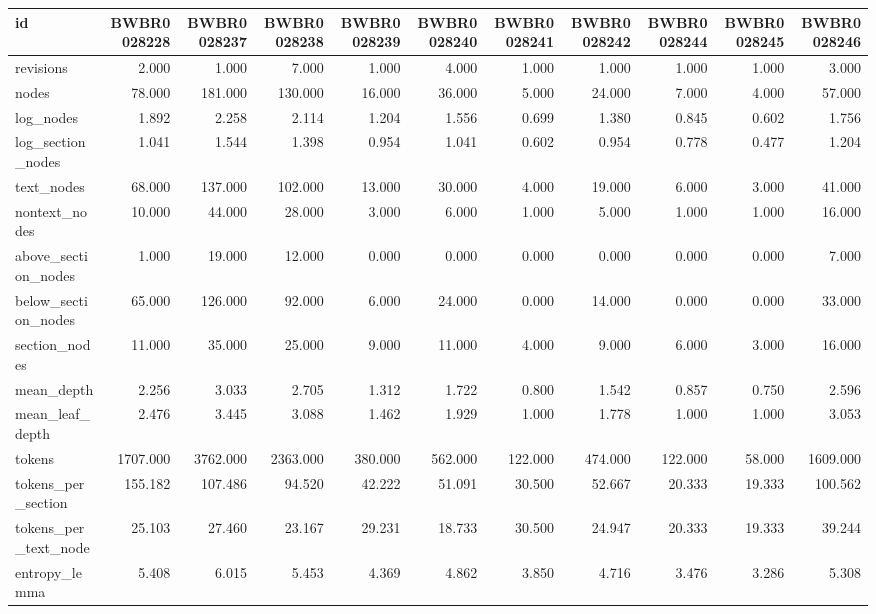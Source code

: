 \begin{tabular}{lrrrrrrrrrr}
\toprule
id & BWBR0028228 & BWBR0028237 & BWBR0028238 & BWBR0028239 & BWBR0028240 & BWBR0028241 & BWBR0028242 & BWBR0028244 & BWBR0028245 & BWBR0028246 \\
\midrule
revisions & 2.000 & 1.000 & 7.000 & 1.000 & 4.000 & 1.000 & 1.000 & 1.000 & 1.000 & 3.000 \\
\cline{1-11}
nodes & 78.000 & 181.000 & 130.000 & 16.000 & 36.000 & 5.000 & 24.000 & 7.000 & 4.000 & 57.000 \\
\cline{1-11}
log\_nodes & 1.892 & 2.258 & 2.114 & 1.204 & 1.556 & 0.699 & 1.380 & 0.845 & 0.602 & 1.756 \\
\cline{1-11}
log\_section\_nodes & 1.041 & 1.544 & 1.398 & 0.954 & 1.041 & 0.602 & 0.954 & 0.778 & 0.477 & 1.204 \\
\cline{1-11}
text\_nodes & 68.000 & 137.000 & 102.000 & 13.000 & 30.000 & 4.000 & 19.000 & 6.000 & 3.000 & 41.000 \\
\cline{1-11}
nontext\_nodes & 10.000 & 44.000 & 28.000 & 3.000 & 6.000 & 1.000 & 5.000 & 1.000 & 1.000 & 16.000 \\
\cline{1-11}
above\_section\_nodes & 1.000 & 19.000 & 12.000 & 0.000 & 0.000 & 0.000 & 0.000 & 0.000 & 0.000 & 7.000 \\
\cline{1-11}
below\_section\_nodes & 65.000 & 126.000 & 92.000 & 6.000 & 24.000 & 0.000 & 14.000 & 0.000 & 0.000 & 33.000 \\
\cline{1-11}
section\_nodes & 11.000 & 35.000 & 25.000 & 9.000 & 11.000 & 4.000 & 9.000 & 6.000 & 3.000 & 16.000 \\
\cline{1-11}
mean\_depth & 2.256 & 3.033 & 2.705 & 1.312 & 1.722 & 0.800 & 1.542 & 0.857 & 0.750 & 2.596 \\
\cline{1-11}
mean\_leaf\_depth & 2.476 & 3.445 & 3.088 & 1.462 & 1.929 & 1.000 & 1.778 & 1.000 & 1.000 & 3.053 \\
\cline{1-11}
tokens & 1707.000 & 3762.000 & 2363.000 & 380.000 & 562.000 & 122.000 & 474.000 & 122.000 & 58.000 & 1609.000 \\
\cline{1-11}
tokens\_per\_section & 155.182 & 107.486 & 94.520 & 42.222 & 51.091 & 30.500 & 52.667 & 20.333 & 19.333 & 100.562 \\
\cline{1-11}
tokens\_per\_text\_node & 25.103 & 27.460 & 23.167 & 29.231 & 18.733 & 30.500 & 24.947 & 20.333 & 19.333 & 39.244 \\
\cline{1-11}
entropy\_lemma & 5.408 & 6.015 & 5.453 & 4.369 & 4.862 & 3.850 & 4.716 & 3.476 & 3.286 & 5.308 \\

\end{tabular}
